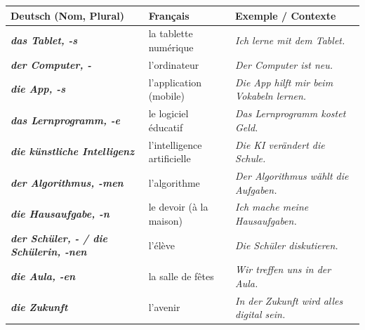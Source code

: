 \documentclass[11pt]{article}
\newcommand{\all}[1]{\ifmmode\text{\textit{#1}}\else\begingroup\selectlanguage{ngerman}\itshape #1\endgroup\fi}
\begin{document}
\begin{aretenir}
\begin{center}
\begin{tabularx}{\linewidth}{|>{\bfseries}l|X|X|}\hline
\rowcolor{popblueL} \textbf{Deutsch (Nom, Plural)} & \textbf{Français} & \textbf{Exemple / Contexte} \\ \hline
\all{das Tablet, -s} & la tablette numérique & \all{Ich lerne mit dem Tablet.} \\ \hline
\all{der Computer, -} & l'ordinateur & \all{Der Computer ist neu.} \\ \hline
\all{die App, -s} & l'application (mobile) & \all{Die App hilft mir beim Vokabeln lernen.} \\ \hline
\all{das Lernprogramm, -e} & le logiciel éducatif & \all{Das Lernprogramm kostet Geld.} \\ \hline
\all{die künstliche Intelligenz} & l'intelligence artificielle & \all{Die KI verändert die Schule.} \\ \hline
\all{der Algorithmus, -men} & l'algorithme & \all{Der Algorithmus wählt die Aufgaben.} \\ \hline
\all{die Hausaufgabe, -n} & le devoir (à la maison) & \all{Ich mache meine Hausaufgaben.} \\ \hline
\all{der Schüler, - / die Schülerin, -nen} & l'élève & \all{Die Schüler diskutieren.} \\ \hline
\all{die Aula, -en} & la salle de fêtes & \all{Wir treffen uns in der Aula.} \\ \hline
\all{die Zukunft} & l'avenir & \all{In der Zukunft wird alles digital sein.} \\ \hline
\end{tabularx}
\end{center}
\end{aretenir}
\end{document}

